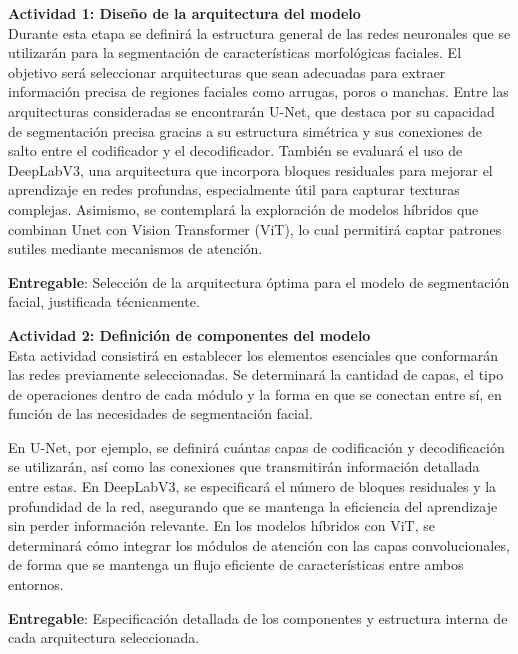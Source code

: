  \textbf{Actividad 1: Diseño de la arquitectura del modelo}
 \\
 Durante esta etapa se definirá la estructura general de las redes neuronales que se utilizarán para la segmentación de características morfológicas faciales. El objetivo será seleccionar arquitecturas que sean adecuadas para extraer información precisa de regiones faciales como arrugas, poros o manchas.
 Entre las arquitecturas consideradas se encontrarán U-Net, que destaca por su capacidad de segmentación precisa gracias a su estructura simétrica y sus conexiones de salto entre el codificador y el decodificador. También se evaluará el uso de DeepLabV3, una arquitectura que incorpora bloques residuales para mejorar el aprendizaje en redes profundas, especialmente útil para capturar texturas complejas. Asimismo, se contemplará la exploración de modelos híbridos que combinan Unet con Vision Transformer (ViT), lo cual permitirá captar patrones sutiles mediante mecanismos de atención.
 
 \textbf{Entregable}: Selección de la arquitectura óptima para el modelo de segmentación facial, justificada técnicamente.

 \textbf{Actividad 2: Definición de componentes del modelo}
 \\
Esta actividad consistirá en establecer los elementos esenciales que conformarán las redes previamente seleccionadas. Se determinará la cantidad de capas, el tipo de operaciones dentro de cada módulo y la forma en que se conectan entre sí, en función de las necesidades de segmentación facial.

En U-Net, por ejemplo, se definirá cuántas capas de codificación y decodificación se utilizarán, así como las conexiones que transmitirán información detallada entre estas. En DeepLabV3, se especificará el número de bloques residuales y la profundidad de la red, asegurando que se mantenga la eficiencia del aprendizaje sin perder información relevante. En los modelos híbridos con ViT, se determinará cómo integrar los módulos de atención con las capas convolucionales, de forma que se mantenga un flujo eficiente de características entre ambos entornos.

 \textbf{Entregable}: Especificación detallada de los componentes y estructura interna de cada arquitectura seleccionada.

